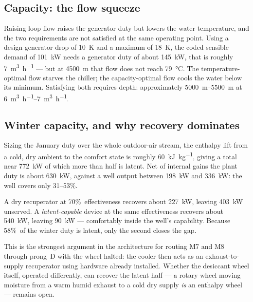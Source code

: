 \documentclass[11pt]{article}
\begin{document}
\subsection{Capacity: the flow squeeze}

Raising loop flow raises the generator duty but lowers the water temperature,
and the two requirements are not satisfied at the same operating point. Using a
design generator drop of \SI{10}{\kelvin} and a maximum of \SI{18}{\kelvin},
the coded sensible demand of \SI{101}{\kilo\watt} needs a generator duty of
about \SI{145}{\kilo\watt}, that is roughly
\SI{7}{\cubic\metre\per\hour} --- but at \SI{4500}{\metre} that flow does not
reach \SI{79}{\degreeCelsius}. The temperature-optimal flow starves the
chiller; the capacity-optimal flow cools the water below its minimum.
Satisfying both requires depth: approximately \SIrange{5000}{5500}{\metre} at
\SIrange{6}{7}{\cubic\metre\per\hour}.

\subsection{Winter capacity, and why recovery dominates}\label{sec:winter}

Sizing the January duty over the whole outdoor-air stream, the enthalpy lift
from a cold, dry ambient to the comfort state is roughly
\SI{60}{\kilo\joule\per\kilogram}, giving a total near \SI{772}{\kilo\watt} of
which more than half is latent. Net of internal gains the plant duty is about
\SI{630}{\kilo\watt}, against a well output between \SI{198}{\kilo\watt} and
\SI{336}{\kilo\watt}: the well covers only 31--53\%.

A dry recuperator at 70\%\ effectiveness recovers about
\SI{227}{\kilo\watt}, leaving \SI{403}{\kilo\watt} unserved. A
\emph{latent-capable} device at the same effectiveness recovers about
\SI{540}{\kilo\watt}, leaving \SI{90}{\kilo\watt} --- comfortably inside the
well's capability. Because 58\%\ of the winter duty is latent, only the second
closes the gap.

This is the strongest argument in the architecture for routing M7 and M8
through prong~D with the wheel halted: the cooler then acts as an
exhaust-to-supply recuperator using hardware already installed. Whether the
desiccant wheel itself, operated differently, can recover the latent half ---
a rotary wheel moving moisture from a warm humid exhaust to a cold dry supply
\emph{is} an enthalpy wheel --- remains open.

\end{document}
